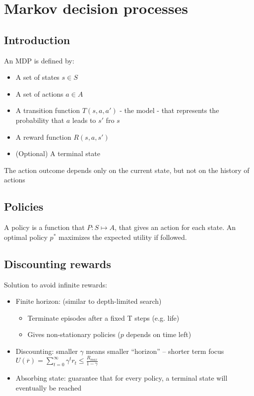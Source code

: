 \section{Markov decision processes}

\subsection{Introduction}

An MDP is defined by:
\begin{itemize}
    \item A set of states $s \in S$
    \item A set of actions $a \in A$
    \item A transition function $T(s, a, a')$ - the model - that represents the probability that $a$ leads to $s'$ fro $s$
    \item A reward function $R(s, a, s')$
    \item (Optional) A terminal state
\end{itemize}

The action outcome depends only on the current state, but not on the history of actions

\subsection{Policies}

A policy is a function that $P: S \mapsto A$, that gives an action for each state. An optimal policy $p^*$ maximizes the expected utility if followed.

\subsection{Discounting rewards}

Solution to avoid infinite rewards:
\begin{itemize}
    \item Finite horizon: (similar to depth-limited search)
    \begin{itemize}
        \item Terminate episodes after a fixed T steps (e.g. life)
        \item Gives non-stationary policies ($p$ depends on time left)
    \end{itemize}
    \item Discounting: smaller $\gamma$ means smaller “horizon” – shorter term focus
    \begin{math}
    U(\overline{r}) = \sum_{t=0}^{\infty}{\gamma^t r_t} \leq \frac{R_{max}}{1-\gamma}
    \end{math}
    \item Absorbing state: guarantee that for every policy, a terminal state will eventually be reached
\end{itemize}

